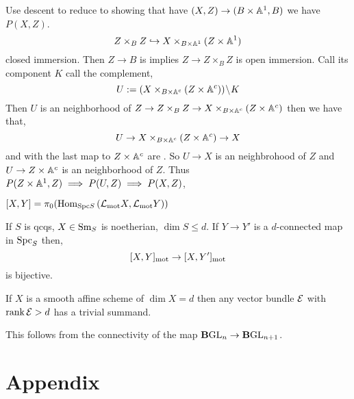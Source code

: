 \documentclass[12pt]{article}
\begin{document}
\begin{rmk}
Use descent to reduce to showing that have \etale $(X, Z) \to (B \times \mathbb{A}^1, B)$ we have $P(X, Z)$.
\[ Z \times_B Z \hookrightarrow X \times_{B \times \mathbb{A}^1} (Z \times \mathbb{A}^1) \]
closed immersion. Then $Z \to B$ is \etale implies $Z \to Z \times_B Z$ is open immersion. Call its component $K$ call the complement,
\[ U := (X \times_{B \times \mathbb{A}^c} (Z \times \mathbb{A}^c)) \! \setminus \! K \]
Then $U$ is an \etale neighborhood of $Z \to Z \times_B Z \to X \times_{B \times \mathbb{A}^c} (Z \times \mathbb{A}^c)$ 
then we have that,
\[ U \to X \times_{B \times \mathbb{A}^c} (Z \times \mathbb{A}^c) \to X \]
and with the last map to $Z \times \mathbb{A}^c$ are \etale. So $U \to X$ is an \etale neighbrohood of $Z$ and $U \to Z \times \mathbb{A}^c$ is an \etale neighborhood of $Z$. Thus $P(Z \times \mathbb{A}^1, Z) \implies P(U, Z) \implies P(X, Z)$,
\begin{center}
\end{center}
\end{rmk}

\begin{defn}
$[X, Y] = \pi_0(\mathrm{Hom}_{\mathrm{Spc}{S}} \left( \mathcal{L}_{\text{mot}} X, \mathcal{L}_{\text{mot}} Y) \right)$
\end{defn}

\begin{theorem}
If $S$ is qcqs, $X \in \mathrm{Sm}_S$ is noetherian, $\dim{S} \le d$. If $Y \to Y'$ is a $d$-connected map in $\mathrm{Spc}_S$ then,
\[ [X, Y]_{\text{mot}} \to [X, Y']_{\text{mot}} \]
is bijective.
\end{theorem}

\begin{theorem}
If $X$ is a smooth affine scheme of $\dim{X} = d$ then any vector bundle $\mathcal{E}$ with $\operatorname{\mathrm{rank}}{\mathcal{E}} > d$ has a trivial summand. 
\end{theorem}

\newcommand{\B}{\mathbf{B}}

\begin{rmk}
This follows from the connectivity of the map $\B \GL_n \to \B \GL_{n+1}$.
\end{rmk}


\newpage

\section{Appendix}
\end{document}

